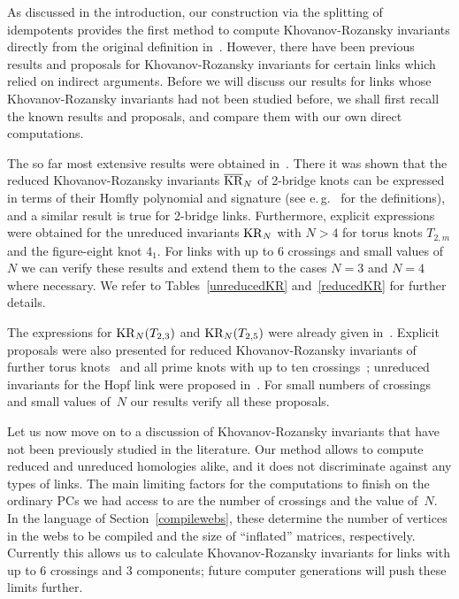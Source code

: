 \documentclass{compositio}
\theoremstyle{definition}
\numberwithin{equation}{section}
\begin{document}
As discussed in the introduction, our construction via the splitting of idempotents provides the first method to compute Khovanov-Rozansky invariants directly from the original definition in~\cite{kr0401268}. However, there have been previous results and proposals for Khovanov-Rozansky invariants for certain links which relied on indirect arguments. Before we will discuss our results for links whose Khovanov-Rozansky invariants had not been studied before, we shall first recall the known results and proposals, and compare them with our own direct computations. 

The so far most extensive results were obtained in~\cite{r0508510, r0607544}. There it was shown that the reduced Khovanov-Rozansky invariants $\overline{\operatorname{KR}}_{N}$ of 2-bridge knots can be expressed in terms of their Homfly polynomial and signature (see e.\,g.~\cite{kawauchibook} for the definitions), and a similar result is true for 2-bridge links. Furthermore, explicit expressions were obtained for the unreduced invariants $\operatorname{KR}_{N}$ with $N>4$ for torus knots $T_{2,m}$ and the figure-eight knot $4_{1}$. For links with up to 6 crossings and small values of~$N$ we can verify these results and extend them to the cases $N=3$ and $N=4$ where necessary. We refer to Tables~\ref{unreducedKR} and~\ref{reducedKR} for further details. 

The expressions for $\operatorname{KR}_{N}(T_{2,3})$ and $\operatorname{KR}_{N}(T_{2,5})$ were already given in~\cite{gsv0412243}. Explicit proposals were also presented for reduced Khovanov-Rozansky invariants of further torus knots~\cite{dgr0505662, as1105.5117} and all prime knots with up to ten crossings~\cite{dgr0505662}; unreduced invariants for the Hopf link were proposed in~\cite{gikv0705.1368}. For small numbers of crossings and small values of~$N$ our results verify all these proposals.

\medskip

Let us now move on to a discussion of Khovanov-Rozansky invariants that have not been previously studied in the literature. Our method allows to compute reduced and unreduced homologies alike, and it does not discriminate against any types of links. The main limiting factors for the computations to finish on the ordinary PCs we had access to are the number of crossings and the value of~$N$. In the language of Section~\ref{compilewebs}, these determine the number of vertices in the webs to be compiled and the size of ``inflated'' matrices, respectively. Currently this allows us to calculate Khovanov-Rozansky invariants for links with up to 6 crossings and 3 components; future computer generations will push these limits further. 
\end{document}
